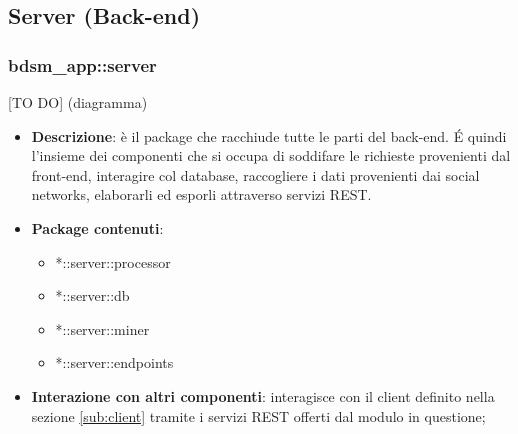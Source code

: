 


\subsection{Server (Back-end)} %
\label{sub:server}

  \subsubsection{bdsm\_app::server} %
  [TO DO] (diagramma) \newline \newline

  \begin{itemize}
    \item \textbf{Descrizione}: è il package che racchiude tutte le parti del back-end. \'E quindi l'insieme dei componenti che si occupa di soddifare le richieste provenienti dal front-end, interagire col database, raccogliere i dati provenienti dai social networks, elaborarli ed esporli attraverso servizi REST.
    \item \textbf{Package contenuti}:
      \begin{itemize}
        \item *::server::processor
        \item *::server::db
        \item *::server::miner
        \item *::server::endpoints
      \end{itemize}
    \item \textbf{Interazione con altri componenti}: interagisce con il client definito nella sezione \ref{sub:client} tramite i servizi REST offerti dal modulo in questione;
  \end{itemize}

